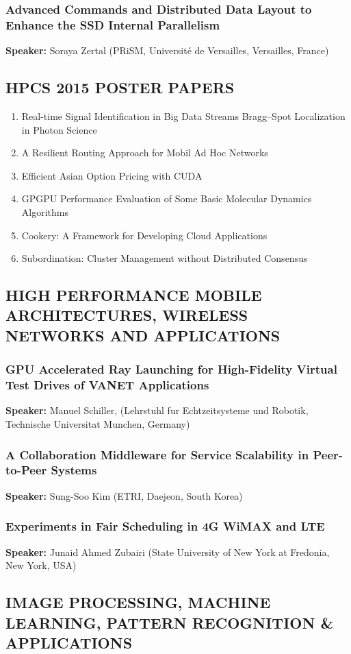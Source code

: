 \documentclass[twocolumn]{article}
\newcommand{\be}{\begin{enumerate}}
\newcommand{\ee}{\end{enumerate}}
\newcommand{\ii}{\item}
\begin{document}
\subsubsection{Advanced Commands and Distributed Data Layout to Enhance the SSD Internal Parallelism}
\textbf{Speaker:} Soraya Zertal (PRiSM, Université de Versailles, Versailles, France)

\subsection{HPCS 2015 POSTER PAPERS}
\be
\ii Real-time Signal Identification in Big Data Streams Bragg–Spot Localization in Photon Science
\ii A Resilient Routing Approach for Mobil Ad Hoc Networks
\ii Efficient Asian Option Pricing with CUDA
\ii GPGPU Performance Evaluation of Some Basic Molecular Dynamics Algorithms
\ii Cookery: A Framework for Developing Cloud Applications
\ii Subordination: Cluster Management without Distributed Consensus
\ee

\subsection{HIGH PERFORMANCE MOBILE ARCHITECTURES, WIRELESS NETWORKS AND APPLICATIONS}
\subsubsection{GPU Accelerated Ray Launching for High-Fidelity Virtual Test Drives of VANET Applications}
\textbf{Speaker:} Manuel Schiller, (Lehrstuhl fur Echtzeitsysteme und Robotik, Technische Universitat Munchen, Germany)
\subsubsection{A Collaboration Middleware for Service Scalability in Peer-to-Peer Systems}
\textbf{Speaker:} Sung-Soo Kim (ETRI, Daejeon, South Korea)
\subsubsection{Experiments in Fair Scheduling in 4G WiMAX and LTE}
\textbf{Speaker:} Junaid Ahmed Zubairi (State University of New York at Fredonia, New York, USA)

\subsection{IMAGE PROCESSING, MACHINE LEARNING, PATTERN RECOGNITION \& APPLICATIONS}
\end{document}
